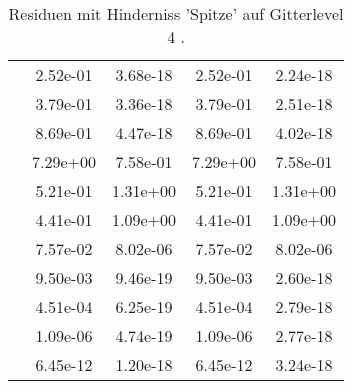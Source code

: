 \begin{table}
\begin{tabular}{c|cc|cc|}
\multicolumn{1}{|c|}{} & \multicolumn{1}{|c|}{  2.52e-01} & \multicolumn{1}{|c|}{  3.68e-18} & \multicolumn{1}{|c|}{  2.52e-01} & \multicolumn{1}{|c|}{  2.24e-18} \\ 
\multicolumn{1}{|c|}{} & \multicolumn{1}{|c|}{  3.79e-01} & \multicolumn{1}{|c|}{  3.36e-18} & \multicolumn{1}{|c|}{  3.79e-01} & \multicolumn{1}{|c|}{  2.51e-18} \\ 
\multicolumn{1}{|c|}{} & \multicolumn{1}{|c|}{  8.69e-01} & \multicolumn{1}{|c|}{  4.47e-18} & \multicolumn{1}{|c|}{  8.69e-01} & \multicolumn{1}{|c|}{  4.02e-18} \\ 
\multicolumn{1}{|c|}{} & \multicolumn{1}{|c|}{  7.29e+00} & \multicolumn{1}{|c|}{  7.58e-01} & \multicolumn{1}{|c|}{  7.29e+00} & \multicolumn{1}{|c|}{  7.58e-01} \\ 
\multicolumn{1}{|c|}{} & \multicolumn{1}{|c|}{  5.21e-01} & \multicolumn{1}{|c|}{  1.31e+00} & \multicolumn{1}{|c|}{  5.21e-01} & \multicolumn{1}{|c|}{  1.31e+00} \\ 
\multicolumn{1}{|c|}{} & \multicolumn{1}{|c|}{  4.41e-01} & \multicolumn{1}{|c|}{  1.09e+00} & \multicolumn{1}{|c|}{  4.41e-01} & \multicolumn{1}{|c|}{  1.09e+00} \\ 
\multicolumn{1}{|c|}{} & \multicolumn{1}{|c|}{  7.57e-02} & \multicolumn{1}{|c|}{  8.02e-06} & \multicolumn{1}{|c|}{  7.57e-02} & \multicolumn{1}{|c|}{  8.02e-06} \\ 
\multicolumn{1}{|c|}{} & \multicolumn{1}{|c|}{  9.50e-03} & \multicolumn{1}{|c|}{  9.46e-19} & \multicolumn{1}{|c|}{  9.50e-03} & \multicolumn{1}{|c|}{  2.60e-18} \\ 
\multicolumn{1}{|c|}{} & \multicolumn{1}{|c|}{  4.51e-04} & \multicolumn{1}{|c|}{  6.25e-19} & \multicolumn{1}{|c|}{  4.51e-04} & \multicolumn{1}{|c|}{  2.79e-18} \\ 
\multicolumn{1}{|c|}{} & \multicolumn{1}{|c|}{  1.09e-06} & \multicolumn{1}{|c|}{  4.74e-19} & \multicolumn{1}{|c|}{  1.09e-06} & \multicolumn{1}{|c|}{  2.77e-18} \\ 
\multicolumn{1}{|c|}{} & \multicolumn{1}{|c|}{  6.45e-12} & \multicolumn{1}{|c|}{  1.20e-18} & \multicolumn{1}{|c|}{  6.45e-12} & \multicolumn{1}{|c|}{  3.24e-18} \\ 
\hline 
\end{tabular}\caption{Residuen mit Hinderniss 'Spitze' auf Gitterlevel 4 .}\label{tab:Residuum_Spitze_level4}
\end{table} 
